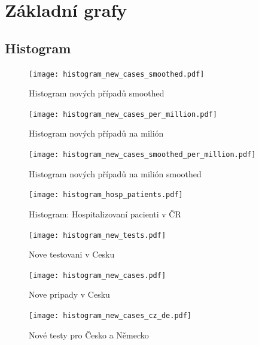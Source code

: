 \documentclass[a4paper]{ article}
\begin{document}
\section{Základní grafy}
\subsection{Histogram}
\begin{figure}[H]
\centering

\texttt{[image: histogram\_new\_cases\_smoothed.pdf]}
\caption{Histogram nových případů smoothed}

\texttt{[image: histogram\_new\_cases\_per\_million.pdf]}
\caption{Histogram nových případů na milión}

\end{figure}
\begin{figure}[H]
\centering

\texttt{[image: histogram\_new\_cases\_smoothed\_per\_million.pdf]}
\caption{Histogram nových případů na milión smoothed}

\texttt{[image: histogram\_hosp\_patients.pdf]}
\caption{Histogram: Hospitalizovaní pacienti v ČR}

\end{figure}
\begin{figure}[H]
\centering

\texttt{[image: histogram\_new\_tests.pdf]}
\caption{Nove testovani v Cesku}

\texttt{[image: histogram\_new\_cases.pdf]}
\caption{Nove pripady v Cesku}

\end{figure}
\begin{figure}[H]
\centering

\texttt{[image: histogram\_new\_cases\_cz\_de.pdf]}
\caption{Nové testy pro Česko a Německo}

\end{figure}
\end{document}
